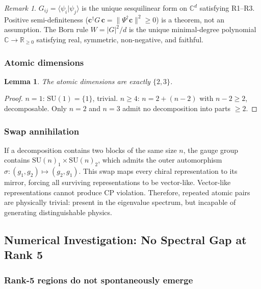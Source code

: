 \documentclass[12pt]{article}
\newtheorem{lemma}[theorem]{Lemma}
\theoremstyle{remark}
\newtheorem{remark}[theorem]{Remark}
\theoremstyle{definition}
\newcommand{\CC}{\mathbb{C}}
\newcommand{\RR}{\mathbb{R}}
\begin{document}
\begin{remark}
$G_{ij} = \langle\psi_i|\psi_j\rangle$ is the unique sesquilinear form on $\CC^d$ satisfying R1--R3. Positive semi-definiteness ($\mathbf{c}^\dagger G\,\mathbf{c} = \|\Psi^\dagger\mathbf{c}\|^2 \geq 0$) is a theorem, not an assumption. The Born rule $W = |G|^2/d$ is the unique minimal-degree polynomial $\CC \to \RR_{\geq 0}$ satisfying real, symmetric, non-negative, and faithful.
\end{remark}

\subsubsection{Atomic dimensions}

\begin{lemma}
The atomic dimensions are exactly $\{2, 3\}$.
\end{lemma}

\begin{proof}
$n = 1$: $\text{SU}(1) = \{1\}$, trivial. $n \geq 4$: $n = 2 + (n-2)$ with $n-2 \geq 2$, decomposable. Only $n = 2$ and $n = 3$ admit no decomposition into parts $\geq 2$.
\end{proof}

\subsubsection{Swap annihilation}

If a decomposition contains two blocks of the same size $n$, the gauge group contains $\text{SU}(n)_1 \times \text{SU}(n)_2$, which admits the outer automorphism $\sigma: (g_1, g_2) \mapsto (g_2, g_1)$. This swap maps every chiral representation to its mirror, forcing all surviving representations to be vector-like. Vector-like representations cannot produce CP violation. Therefore, repeated atomic pairs are physically trivial: present in the eigenvalue spectrum, but incapable of generating distinguishable physics.

\subsection{Numerical Investigation: No Spectral Gap at Rank 5}

\subsubsection{Rank-5 regions do not spontaneously emerge}
\end{document}
